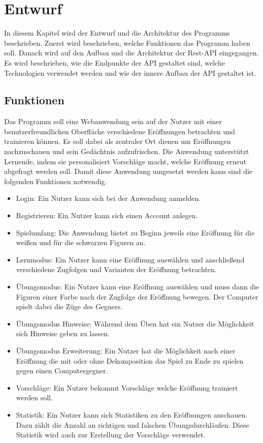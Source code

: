 
\chapter{Entwurf}
In diesem Kapitel wird der Entwurf und die Architektur des Programms beschrieben. Zuerst wird beschrieben, welche Funktionen das Programm haben soll. Danach wird auf den Aufbau und die Architektur der Rest-API eingegangen. Es wird beschrieben, wie die Endpunkte der API gestaltet sind, welche Technologien verwendet werden und wie der innere Aufbau der API gestaltet ist.


\section{Funktionen}
Das Programm soll eine Webanwendung sein auf der Nutzer mit einer benutzerfreundlichen Oberfläche verschiedene Eröffnungen betrachten und trainieren können. Es soll dabei als zentraler Ort dienen um Eröffnungen nachzuschauen und sein Gedächtnis aufzufrischen. Die Anwendung unterstützt Lernende, indem sie personalisiert Vorschläge macht, welche Eröffnung erneut abgefragt werden soll. Damit diese Anwendung umgesetzt werden kann sind die folgenden Funktionen notwendig.

\begin{itemize}
    \item Login: Ein Nutzer kann sich bei der Anwendung anmelden.
    \item Registrieren: Ein Nutzer kann sich einen Account anlegen.
    \item Spielumfang: Die Anwendung bietet zu Beginn jeweils eine Eröffnung für die weißen und für die schwarzen Figuren an.
    \item Lernmodus: Ein Nutzer kann eine Eröffnung auswählen und anschließend verschiedene Zugfolgen und Varianten der Eröffnung betrachten.
    \item Übungsmodus: Ein Nutzer kann eine Eröffnung auswählen und muss dann die Figuren einer Farbe nach der Zugfolge der Eröffnung bewegen. Der Computer spielt dabei die Züge des Gegners.
    \item Übungsmodus Hinweise: Während dem Üben hat ein Nutzer die Möglichkeit sich Hinweise geben zu lassen.
    \item Übungsmodus Erweiterung: Ein Nutzer hat die Möglichkeit nach einer Eröffnung die mit oder ohne Dekomposition das Spiel zu Ende zu spielen gegen einen Computergegner.
    \item Vorschläge: Ein Nutzer bekommt Vorschläge welche Eröffnung trainiert werden soll.
    \item Statistik: Ein Nutzer kann sich Statistiken zu den Eröffnungen anschauen. Dazu zählt die Anzahl an richtigen und falschen Übungsdurchläufen. Diese Statistik wird auch zur Erstellung der Vorschläge verwendet.
\end{itemize}

